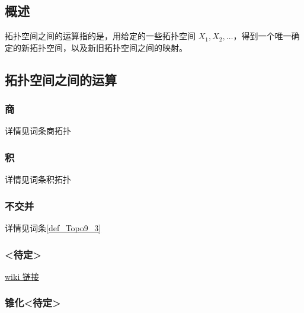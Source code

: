 
\begin{issues}
\issueDraft
\issueTODO
\issueMissDepend
\issueAbstract
\issueNeedCite
\end{issues}

\subsection{概述}

拓扑空间之间的运算指的是，用给定的一些拓扑空间 $X_1, X_2, \dots$，得到一个唯一确定的新拓扑空间，以及新旧拓扑空间之间的映射。


\subsection{拓扑空间之间的运算}

\subsubsection{商}

详情见词条商拓扑


\subsubsection{积}

详情见词条积拓扑


\subsubsection{不交并}

详情见词条\autoref{def_Topo9_3}~


\subsubsection{<待定>}

\href{https://en.m.wikipedia.org/wiki/Join_(topology)}{wiki 链接}


\subsubsection{锥化<待定>}

